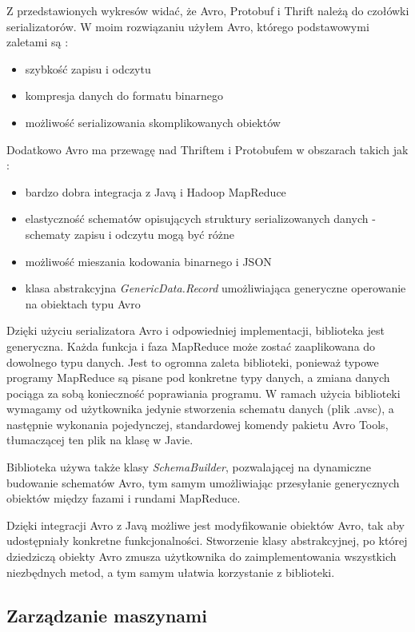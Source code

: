 \documentclass[licencjacka]{pracamgr}
\begin{document}
Z przedstawionych wykresów widać, że Avro, Protobuf i Thrift należą do czołówki serializatorów. W moim rozwiązaniu użyłem Avro, którego podstawowymi zaletami są \cite{avro}:
\begin{itemize}
    \item szybkość zapisu i odczytu
    \item kompresja danych do formatu binarnego
    \item możliwość serializowania skomplikowanych obiektów
\end{itemize}

Dodatkowo Avro ma przewagę nad Thriftem i Protobufem w obszarach takich jak \cite{avro, protobuf, thrift}:
\begin{itemize}
    \item bardzo dobra integracja z Javą i Hadoop MapReduce
    \item elastyczność schematów opisujących struktury serializowanych danych - schematy zapisu i odczytu mogą być różne
    \item możliwość mieszania kodowania binarnego i JSON
    \item klasa abstrakcyjna \textit{GenericData.Record} umożliwiająca generyczne operowanie na obiektach typu Avro
\end{itemize}

Dzięki użyciu serializatora Avro i odpowiedniej implementacji, biblioteka jest generyczna. Każda funkcja i faza MapReduce może zostać zaaplikowana do dowolnego typu danych. Jest to ogromna zaleta biblioteki, ponieważ typowe programy MapReduce są pisane pod konkretne typy danych, a zmiana danych pociąga za sobą konieczność poprawiania programu. W ramach użycia biblioteki wymagamy od użytkownika jedynie stworzenia schematu danych (plik .avsc), a następnie wykonania pojedynczej, standardowej komendy pakietu Avro Tools, tłumaczącej ten plik na klasę w Javie.

Biblioteka używa także klasy \textit{SchemaBuilder}, pozwalającej na dynamiczne budowanie schematów Avro, tym samym umożliwiając przesyłanie generycznych obiektów między fazami i rundami MapReduce.

Dzięki integracji Avro z Javą możliwe jest modyfikowanie obiektów Avro, tak aby udostępniały konkretne funkcjonalności. Stworzenie klasy abstrakcyjnej, po której dziedziczą obiekty Avro zmusza użytkownika do zaimplementowania wszystkich niezbędnych metod, a tym samym ułatwia korzystanie z biblioteki.

\subsection{Zarządzanie maszynami}
\end{document}

